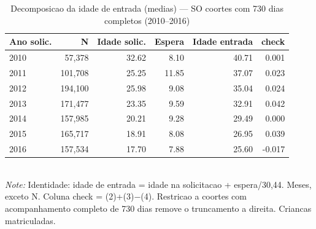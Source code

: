 \begin{table}[htbp]\centering
\caption{Decomposicao da idade de entrada (medias) --- SO coortes com 730 dias completos (2010--2016)}
\label{tab:R2c_decomp730}
\small
\begin{tabular}{lrrrrr}
\toprule
Ano solic. & N & Idade solic. & Espera & Idade entrada & check \\
\midrule
2010 & 57,378 & 32.62 & 8.10 & 40.71 & 0.001 \\
2011 & 101,708 & 25.25 & 11.85 & 37.07 & 0.023 \\
2012 & 194,100 & 25.98 & 9.08 & 35.04 & 0.024 \\
2013 & 171,477 & 23.35 & 9.59 & 32.91 & 0.042 \\
2014 & 157,985 & 20.21 & 9.28 & 29.49 & 0.000 \\
2015 & 165,717 & 18.91 & 8.08 & 26.95 & 0.039 \\
2016 & 157,534 & 17.70 & 7.88 & 25.60 & -0.017 \\
\bottomrule
\end{tabular}
\\[3pt]{\footnotesize \textit{Note:} Identidade: idade de entrada = idade na solicitacao + espera/30,44. Meses, exceto N. Coluna check = (2)+(3)$-$(4). Restricao a coortes com acompanhamento completo de 730 dias remove o truncamento a direita. Criancas matriculadas.}
\end{table}
